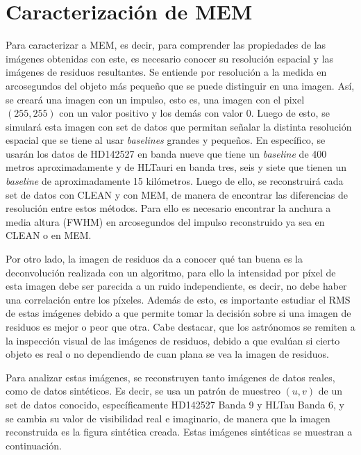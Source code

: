 \section{Caracterización de MEM}

Para caracterizar a MEM, es decir, para comprender las propiedades de las imágenes obtenidas con este, es necesario conocer su resolución espacial y las imágenes de residuos resultantes. Se entiende por resolución a la medida en arcosegundos del objeto más pequeño que se puede distinguir en una imagen. Así, se creará una imagen con un impulso, esto es, una imagen con el pixel $(255,255)$ con un valor positivo y los demás con valor 0. Luego de esto, se simulará esta imagen con set de datos que permitan señalar la distinta resolución espacial que se tiene al usar \textit{baselines} grandes y pequeños. En específico, se usarán los datos de HD142527 en banda nueve que tiene un \textit{baseline} de 400 metros aproximadamente y de HLTauri en banda tres, seis y siete que tienen un \textit{baseline} de aproximadamente 15 kilómetros. Luego de ello, se reconstruirá cada set de datos con CLEAN y con MEM, de manera de encontrar las diferencias de resolución entre estos métodos. Para ello es necesario encontrar la anchura a media altura (FWHM) en arcosegundos del impulso reconstruido ya sea en CLEAN o en MEM.

Por otro lado, la imagen de residuos da a conocer qué tan buena es la deconvolución realizada con un algoritmo, para ello la intensidad por píxel de esta imagen debe ser parecida a un ruido independiente, es decir, no debe haber una correlación entre los píxeles. Además de esto, es importante estudiar el RMS de estas imágenes debido a que permite tomar la decisión sobre si una imagen de residuos es mejor o peor que otra. Cabe destacar, que los astrónomos se remiten a la inspección visual de las imágenes de residuos, debido a que evalúan si cierto objeto es real o no dependiendo de cuan plana se vea la imagen de residuos.

Para analizar estas imágenes, se reconstruyen tanto imágenes de datos reales, como de datos sintéticos. Es decir, se usa un patrón de muestreo $(u,v)$ de un set de datos conocido, específicamente HD142527 Banda 9 y HLTau Banda 6, y se cambia su valor de visibilidad real e imaginario, de manera que la imagen reconstruida es la figura sintética creada. Estas imágenes sintéticas se muestran a continuación.

